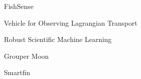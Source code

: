 \item FishSense
\item Vehicle for Observing Lagrangian Transport
\item Robust Scientific Machine Learning
\item Grouper Moon
\item Smartfin

